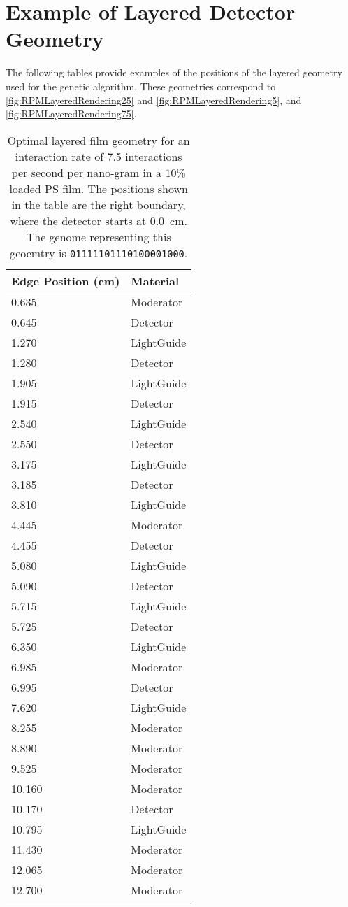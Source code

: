 \section{Example of Layered Detector Geometry}
The following tables provide examples of the positions of the layered geometry used for the genetic algorithm. 
These geometries correspond to \autoref{fig:RPMLayeredRendering25} and \autoref{fig:RPMLayeredRendering5}, and \autoref{fig:RPMLayeredRendering75}.
\begin{table}
	\caption[Optimal Layered Film Geometry for 7.5 interaction per second per nanogram Cf-252]{Optimal layered film geometry for an interaction rate of 7.5 interactions per second per nano-gram  in a 10\%  loaded PS film. The positions shown in the table are the right boundary, where the detector starts at \SI{0.0}{\cm}. The genome representing this geoemtry is \texttt{01111101110100001000}.}
	\begin{tabular}{m{3cm} m{4cm}}
	\toprule
	Edge Position (\si{\cm}) & Material \\
	\midrule
0.635&Moderator\\
0.645&Detector\\
1.270&LightGuide\\
1.280&Detector\\
1.905&LightGuide\\
1.915&Detector\\
2.540&LightGuide\\
2.550&Detector\\
3.175&LightGuide\\
3.185&Detector\\
3.810&LightGuide\\
4.445&Moderator\\
4.455&Detector\\
5.080&LightGuide\\
5.090&Detector\\
5.715&LightGuide\\
5.725&Detector\\
6.350&LightGuide\\
6.985&Moderator\\
6.995&Detector\\
7.620&LightGuide\\
8.255&Moderator\\
8.890&Moderator\\
9.525&Moderator\\
10.160&Moderator\\
10.170&Detector\\
10.795&LightGuide\\
11.430&Moderator\\
12.065&Moderator\\
12.700&Moderator\\
	\bottomrule
	\end{tabular}
\end{table}
